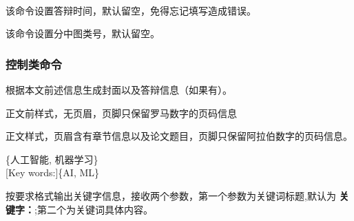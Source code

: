 \documentclass{ctxdoc}
\begin{document}
    \begin{function}[added=2024-08-18]{}
        \begin{syntax}
             \
        \end{syntax}
        该命令设置答辩时间，默认留空，免得忘记填写造成错误。
    \end{function}





    \begin{function}[added=2024-08-18]{\classifyno}
        \begin{syntax}
        \end{syntax}
        该命令设置分中图类号，默认留空。
    \end{function}

    \subsubsection{控制类命令}

    \begin{function}[added=2024-08-18]{\maketitle}
        \begin{syntax}
        \end{syntax}
        根据本文前述信息生成封面以及答辩信息（如果有）。
    \end{function}

    \begin{function}[added=2024-08-18]{\frontmatter}
        \begin{syntax}
        \end{syntax}
        正文前样式，无页眉，页脚只保留罗马数字的页码信息
    \end{function}

    \begin{function}[added=2024-08-18]{\mainmatter}
        \begin{syntax}
        \end{syntax}
        正文样式，页眉含有章节信息以及论文题目，页脚只保留阿拉伯数字的页码信息。
    \end{function}


    \begin{function}[added=2024-08-18]{\keywords}
        \begin{syntax}
            \{人工智能, 机器学习\}\\
            \cs{keywords}[Key words:]\{AI, ML\}
        \end{syntax}
        按要求格式输出关键字信息，接收两个参数，第一个参数为关键词标题,默认为 \textbf{关键字：};第二个为关键词具体内容。
    \end{function}
\end{document}
